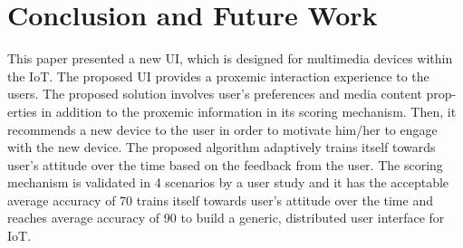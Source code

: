 \documentclass[runningheads,a4paper]{llncs}
\begin{document}
\section{Conclusion and Future Work}

This paper presented a new UI, which is designed for multimedia devices within
the IoT. The proposed UI provides a proxemic interaction experience to the
users. The proposed solution involves user’s preferences and media content prop-
erties in addition to the proxemic information in its scoring mechanism. Then,
it recommends a new device to the user in order to motivate him/her to engage
with the new device. The proposed algorithm adaptively trains itself towards
user’s attitude over the time based on the feedback from the user. The scoring
mechanism is validated in 4 scenarios by a user study and it has the acceptable
average accuracy of 70%
trains itself towards user’s attitude over the time and reaches average accuracy
of 90%
to build a generic, distributed user interface for IoT.
\end{document}
